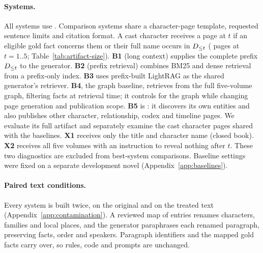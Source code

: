 \paragraph{Systems.}
All systems use . Comparison systems share a character-page template,
requested sentence limits and citation format. A cast character receives a page at $t$ if an eligible
gold fact concerns them or their full name occurs in $D_{\le t}$
( pages at $t=1..5$; Table~\ref{tab:artifact-size}).
\textbf{B1} (long context) supplies the complete prefix $D_{\le t}$ to the generator.
\textbf{B2} (prefix retrieval) combines BM25 and dense retrieval from a prefix-only index.
\textbf{B3} uses prefix-built LightRAG \citep{guo2024lightrag} as the shared generator's retriever.
\textbf{B4}, the graph baseline, retrieves from the full five-volume \sys graph, filtering
facts at retrieval time; it controls for the graph while changing page generation and
publication scope.
\textbf{B5} is \sys: it discovers its own entities and also publishes other character,
relationship, codex and timeline pages. We evaluate its full artifact and separately examine
the cast character pages shared with the baselines.
\textbf{X1} receives only the title and character name (closed book).
\textbf{X2} receives all five volumes with an instruction to reveal nothing after $t$.
These two diagnostics are excluded from best-system comparisons. Baseline settings were
fixed on a separate development novel (Appendix~\ref{app:baselines}).

\paragraph{Paired text conditions.}
Every system is built twice, on the original and on the treated text
(Appendix~\ref{app:contamination}). A reviewed map of  entries renames
characters, families and local places, and the generator paraphrases each renamed
paragraph, preserving facts, order and speakers. Paragraph identifiers and the mapped gold
facts carry over, so rules, code and prompts are unchanged.

